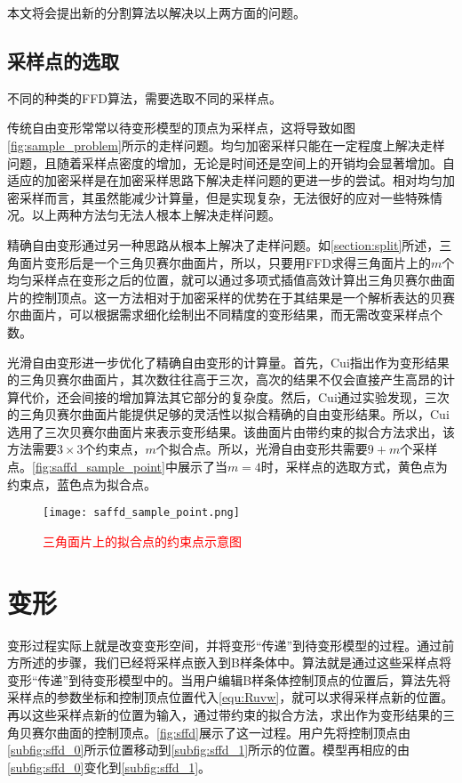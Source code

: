 本文将会提出新的分割算法以解决以上两方面的问题。

\subsection{采样点的选取}
不同的种类的FFD算法，需要选取不同的采样点。

传统自由变形常常以待变形模型的顶点为采样点，这将导致如图\autoref{fig:sample_problem}所示的走样问题。均匀加密采样只能在一定程度上解决走样问题，且随着采样点密度的增加，无论是时间还是空间上的开销均会显著增加。自适应的加密采样是在加密采样思路下解决走样问题的更进一步的尝试。相对均匀加密采样而言，其虽然能减少计算量，但是实现复杂，无法很好的应对一些特殊情况。以上两种方法匀无法人根本上解决走样问题。

精确自由变形\cite{Feng00}通过另一种思路从根本上解决了走样问题。如\ref{section:split}所述，三角面片变形后是一个三角贝赛尔曲面片，所以，只要用FFD求得三角面片上的$m$个均匀采样点在变形之后的位置，就可以通过多项式插值高效计算出三角贝赛尔曲面片的控制顶点。这一方法相对于加密采样的优势在于其结果是一个解析表达的贝赛尔曲面片，可以根据需求细化绘制出不同精度的变形结果，而无需改变采样点个数。

光滑自由变形\cite{Cui15}进一步优化了精确自由变形的计算量。首先，Cui指出作为变形结果的三角贝赛尔曲面片，其次数往往高于三次，高次的结果不仅会直接产生高昂的计算代价，还会间接的增加算法其它部分的复杂度。然后，Cui通过实验发现，三次的三角贝赛尔曲面片能提供足够的灵活性以拟合精确的自由变形结果。所以，Cui选用了三次贝赛尔曲面片来表示变形结果。该曲面片由带约束的拟合方法求出，该方法需要$3\times3$个约束点，$m$个拟合点。所以，光滑自由变形共需要$9+m$个采样点。\autoref{fig:saffd_sample_point}中展示了当$m=4$时，采样点的选取方式，黄色点为约束点，蓝色点为拟合点。

\begin{figure}[htbp]
	\centering
	\texttt{[image: saffd\_sample\_point.png]}
    \caption{\textcolor{red}{三角面片上的拟合点的约束点示意图}}\label{fig:saffd_sample_point}
\end{figure}


\section{变形}
变形过程实际上就是改变变形空间，并将变形“传递”到待变形模型的过程。通过前方所述的步骤，我们已经将采样点嵌入到B样条体中。算法就是通过这些采样点将变形“传递”到待变形模型中的。当用户编辑B样条体控制顶点的位置后，算法先将采样点的参数坐标和控制顶点位置代入\autoref{equ:Ruvw}，就可以求得采样点新的位置。再以这些采样点新的位置为输入，通过带约束的拟合方法，求出作为变形结果的三角贝赛尔曲面的控制顶点。\autoref{fig:sffd}展示了这一过程。用户先将控制顶点由\autoref{subfig:sffd_0}所示位置移动到\autoref{subfig:sffd_1}所示的位置。模型再相应的由\autoref{subfig:sffd_0}变化到\autoref{subfig:sffd_1}。


